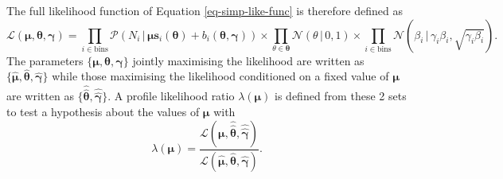 The full likelihood function of Equation \ref{eq-simp-like-func} is therefore defined as
\begin{equation}
\mathcal{L}\left(\boldsymbol{\mu}, \boldsymbol{\theta}, \boldsymbol{\gamma}\right) = \prod_{i\in \textrm{bins}} \mathcal{P}(N_i \,|\, \boldsymbol{\mu} \boldsymbol{s}_i(\boldsymbol{\theta}) + b_i(\boldsymbol{\theta}, \boldsymbol{\gamma})) \times  \prod_{\theta \in \boldsymbol{\theta}} \mathcal{N}(\theta \,|\, 0, 1) \times \prod_{i \in \textrm{bins}} \mathcal{N}(\beta_i \,|\, \gamma_i \beta_i, \sqrt{\gamma_i \beta_i}).
\end{equation}
The parameters $\{\boldsymbol{\mu}, \boldsymbol{\theta}, \boldsymbol{\gamma}\}$ jointly maximising the likelihood are written as $\{\hat{\boldsymbol{\mu}}, \hat{\boldsymbol{\theta}}, \hat{\boldsymbol{\gamma}}\}$ while those maximising the likelihood conditioned on a fixed value of $\boldsymbol{\mu}$ are written as $\{\hat{\hat{\boldsymbol{\theta}}}, \hat{\hat{\boldsymbol{\gamma}}}\}$. A profile likelihood ratio $\lambda(\boldsymbol{\mu})$  is defined from these 2 sets to test a hypothesis about the values of $\boldsymbol{\mu}$ with
\begin{equation}\label{eq-lik-ratio}
    \lambda(\boldsymbol{\mu}) = \frac{\mathcal{L}\left(\boldsymbol{\mu}, \hat{\hat{\boldsymbol{\theta}}}, \hat{\hat{\boldsymbol{\gamma}}} \right)}{\mathcal{L}\left(\hat{\boldsymbol{\mu}}, \hat{\boldsymbol{\theta}}, \hat{\boldsymbol{\gamma}} \right)}.
\end{equation}

